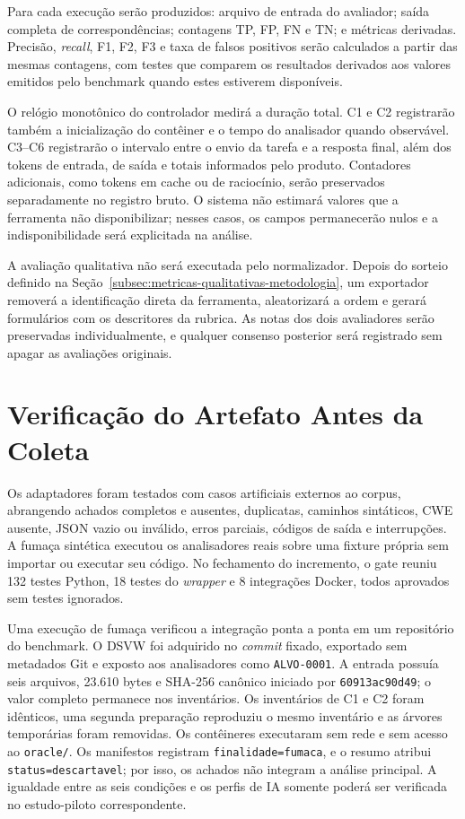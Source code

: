 Para cada execução serão produzidos: arquivo de entrada do avaliador; saída completa de correspondências; contagens TP, FP, FN e TN; e métricas derivadas. Precisão, \textit{recall}, F1, F2, F3 e taxa de falsos positivos serão calculados a partir das mesmas contagens, com testes que comparem os resultados derivados aos valores emitidos pelo benchmark quando estes estiverem disponíveis.

O relógio monotônico do controlador medirá a duração total. C1 e C2 registrarão também a inicialização do contêiner e o tempo do analisador quando observável. C3--C6 registrarão o intervalo entre o envio da tarefa e a resposta final, além dos tokens de entrada, de saída e totais informados pelo produto. Contadores adicionais, como tokens em cache ou de raciocínio, serão preservados separadamente no registro bruto. O sistema não estimará valores que a ferramenta não disponibilizar; nesses casos, os campos permanecerão nulos e a indisponibilidade será explicitada na análise.

A avaliação qualitativa não será executada pelo normalizador. Depois do sorteio definido na Seção~\ref{subsec:metricas-qualitativas-metodologia}, um exportador removerá a identificação direta da ferramenta, aleatorizará a ordem e gerará formulários com os descritores da rubrica. As notas dos dois avaliadores serão preservadas individualmente, e qualquer consenso posterior será registrado sem apagar as avaliações originais.

\section{Verificação do Artefato Antes da Coleta}\label{sec:verificacao-artefato-desenvolvimento}

Os adaptadores foram testados com casos artificiais externos ao corpus, abrangendo achados completos e ausentes, duplicatas, caminhos sintáticos, CWE ausente, JSON vazio ou inválido, erros parciais, códigos de saída e interrupções. A fumaça sintética executou os analisadores reais sobre uma fixture própria sem importar ou executar seu código. No fechamento do incremento, o gate reuniu 132 testes Python, 18 testes do \textit{wrapper} e 8 integrações Docker, todos aprovados sem testes ignorados.

Uma execução de fumaça verificou a integração ponta a ponta em um repositório do benchmark. O DSVW foi adquirido no \textit{commit} fixado, exportado sem metadados Git e exposto aos analisadores como \texttt{ALVO-0001}. A entrada possuía seis arquivos, 23.610 bytes e SHA-256 canônico iniciado por \texttt{60913ac90d49}; o valor completo permanece nos inventários. Os inventários de C1 e C2 foram idênticos, uma segunda preparação reproduziu o mesmo inventário e as árvores temporárias foram removidas. Os contêineres executaram sem rede e sem acesso ao \texttt{oracle/}. Os manifestos registram \texttt{finalidade=fumaca}, e o resumo atribui \texttt{status=descartavel}; por isso, os achados não integram a análise principal. A igualdade entre as seis condições e os perfis de IA somente poderá ser verificada no estudo-piloto correspondente.

